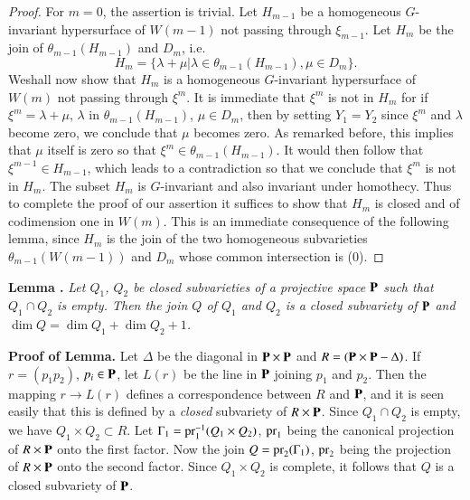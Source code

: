\begin{proof}
For $m=0$, the assertion is trivial. Let $H_{m-1}$ be a homogeneous $G$-invariant hypersurface of $W(m-1)$ not passing through $\xi_{m-1}$. Let $H_{m}$ be the join of $\theta_{m-1}(H_{m-1})$ and $D_{m}$, i.e.
$$
H_{m}=\{\lambda+\mu|\lambda\in \theta_{m-1}(H_{m-1}), \mu\in D_{m}\}.
$$
We\pageoriginale shall now show that $H_{m}$ is a homogeneous $G$-invariant hypersurface of $W(m)$ not passing through $\xi^{m}$. It is immediate that $\xi^{m}$ is not in $H_{m}$ for if $\xi^{m}=\lambda+\mu$, $\lambda$ in $\theta_{m-1}(H_{m-1})$, $\mu\in D_{m}$, then by setting $Y_{1}=Y_{2}$ since $\xi^{m}$ and $\lambda$ become zero, we conclude that $\mu$ becomes zero. As remarked before, this implies that $\mu$ itself is zero so that $\xi^{m}\in \theta_{m-1}(H_{m-1})$. It would then follow that $\xi^{m-1}\in H_{m-1}$, which leads to a contradiction so that we conclude that $\xi^{m}$ is not in $H_{m}$. The subset $H_{m}$ is $G$-invariant and also invariant under homothecy. Thus to complete the proof of our assertion it suffices to show that $H_{m}$ is closed and of codimension one in $W(m)$. This is an immediate consequence of the following lemma, since $H_{m}$ is the join of the two homogeneous subvarieties $\theta_{m-1}(W(m-1))$ and $D_{m}$ whose common intersection is (0).
\end{proof}

\medskip
\noindent
{\bf Lemma .\label{art18-lem1}}
{\em Let $Q_{1}$, $Q_{2}$ be closed subvarieties of a projective space $\mathbf{P}$ such that $Q_{1}\cap Q_{2}$ is empty. Then the join $Q$ of $Q_{1}$ and $Q_{2}$ is a closed subvariety of $\mathbf{P}$ and $\dim Q=\dim Q_{1}+\dim Q_{2}+1$.}
\smallskip

\noindent
{\bf Proof of Lemma.} Let $\Delta$ be the diagonal in $\mathbf{P}\times \mathbf{P}$ and $R=(\mathbf{P}\times \mathbf{P}-\Delta)$. If $r=(p_{1}p_{2})$, $p_{i}\in \mathbf{P}$, let $L(r)$ be the line in $\mathbf{P}$ joining $p_{1}$ and $p_{2}$. Then the mapping $r\to L(r)$ defines a correspondence between $R$ and $\mathbf{P}$, and it is seen easily that this is defined by a {\em closed} subvariety of $R\times \mathbf{P}$. Since $Q_{1}\cap Q_{2}$ is empty, we have $Q_{1}\times Q_{2}\subset R$. Let $\Gamma_{1}=\operatorname{\mathrm{pr}}^{-1}_{1}(Q_{1}\times Q_{2})$, $\operatorname{\mathrm{pr}}_{1}$ being the canonical projection of $R\times \mathbf{P}$ onto the first factor. Now the join $Q=\operatorname{\mathrm{pr}}_{2}(\Gamma_{1})$, $\operatorname{\mathrm{pr}}_{2}$ being the projection of $R\times \mathbf{P}$ onto the second factor. Since $Q_{1}\times Q_{2}$ is complete, it follows that $Q$ is a closed subvariety of $\mathbf{P}$.

